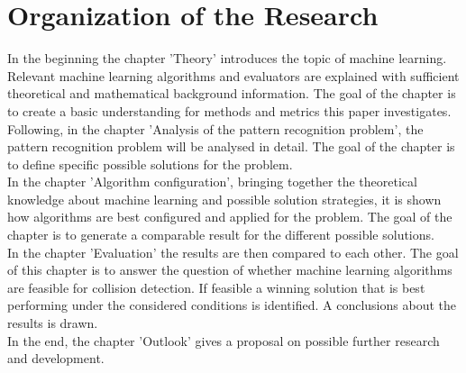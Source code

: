 \section{Organization of the Research}
In the beginning the chapter 'Theory' introduces the topic of machine learning. Relevant machine learning algorithms and evaluators are explained with sufficient theoretical and mathematical background information. The goal of the chapter is to create a basic understanding for methods and metrics this paper investigates.\\
Following, in the chapter 'Analysis of the pattern recognition problem', the pattern recognition problem will be analysed in detail. The goal of the chapter is to define specific possible solutions for the problem. \\
In the chapter 'Algorithm configuration', bringing together the theoretical knowledge about machine learning and possible solution strategies, it is shown how algorithms are best configured and applied for the problem. The goal of the chapter is to generate a comparable result for the different possible solutions. \\
In the chapter 'Evaluation' the results are then compared to each other. The goal of this chapter is to answer the question of whether machine learning algorithms are feasible for collision detection. If feasible a winning solution that is best performing under the considered conditions is identified. A conclusions about the results is drawn. \\
In the end, the chapter 'Outlook' gives a proposal on possible further research and development.